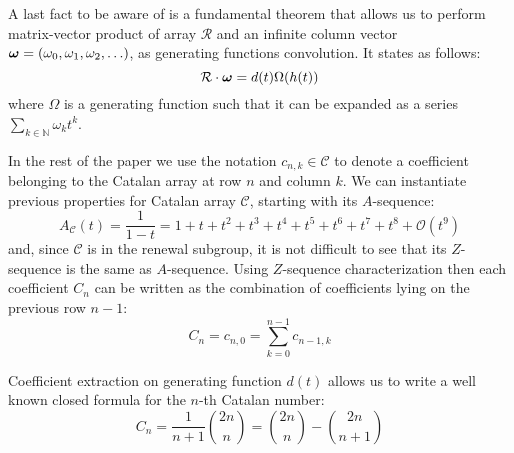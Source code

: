 A last fact to be aware of is a fundamental theorem that allows us to perform 
matrix-vector product of array $\mathcal{R}$ and an infinite column vector 
$\boldsymbol{\omega}=(\omega_{0},\omega_{1},\omega_{2},\ldots)$,
as generating functions convolution. It states as follows:
\begin{equation}
    \mathcal{R}\cdot\boldsymbol{\omega} = d(t)\Omega(h(t))    
\end{equation}
where $\Omega$ is a generating function such that it can be expanded 
as a series $\sum_{k\in\mathbb{N}}{\omega_{k}t^{k}}$.

In the rest of the paper we use the notation $c_{n,k}\in\mathcal{C}$ to denote
a coefficient belonging to the Catalan array at row $n$ and column $k$.
We can instantiate previous properties for Catalan array $\mathcal{C}$, starting with its $A$-sequence:
\begin{displaymath}
    A_{\mathcal{C}}(t)=\frac{1}{1-t}=1+t+t^{2}+t^{3}+t^{4}+t^{5}+t^{6}+t^{7}+t^{8}+
        \mathcal{O}(t^{9})
\end{displaymath}
and, since $\mathcal{C}$ is in the renewal subgroup, it is not difficult to see that its
$Z$-sequence is the same as $A$-sequence. Using $Z$-sequence characterization then 
each coefficient $C_{n}$ can be written as the combination of coefficients 
lying on the previous row $n-1$:
\begin{displaymath}
    C_{n} = c_{n,0} = \sum_{k=0}^{n-1}{c_{n-1,k}}
\end{displaymath}
\iffalse
in other words, $C_{n}$ equals the $(n-1)$-row sum of $\mathcal{C}$, 
therefore by the fundamental theorem:
\begin{displaymath}
    C_{n} = [t^{n-1}]\mathcal{C}\,A_{\mathcal{C}}(t)
          = [t^{n-1}]d(t)\,A_{\mathcal{C}}(h(t))
          = [t^{n}]h(t)\,A_{\mathcal{C}}(h(t))
\end{displaymath}
yielding:
\begin{displaymath}
    C_{n} = [t^{n}]\frac{1-\sqrt{1-4 \, t}}{1+\sqrt{1-4 \, t}}
\end{displaymath}
for $n>0$ and boundary condition $C_{0}=1$. 
Moreover, from the above equation, it is possible to derive
another generating function for the sequence of Catalan numbers:
\begin{displaymath}
    \frac{1-\sqrt{1-4 \, t}}{1+\sqrt{1-4 \, t}}=
    \frac{\left(1-\sqrt{1-4 \, t}\right)^{2}}{4 \, t}=
    \frac{1-2\,t-\sqrt{1-4 \, t}}{2 \, t}
\end{displaymath}
\fi
Coefficient extraction on generating function $d(t)$ allows us to write 
a well known closed formula for the $n$-th Catalan number:
\begin{equation}
    C_{n} = \frac{1}{n+1}{{2n}\choose{n}} 
        = {{2n}\choose{n}} - {{2n}\choose{n+1}}
    \label{eq:catalan:coeff:rewriting}
\end{equation}

